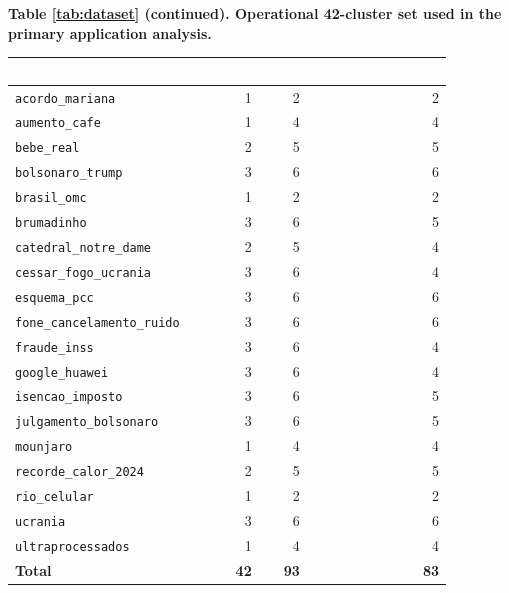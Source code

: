 \documentclass[sn-basic,Numbered]{sn-jnl}
\newcommand{\hd}[1]{\textcolor{white}{\textbf{#1}}}
\begin{document}
\FloatBarrier
\begin{center}
\textbf{Table \ref{tab:dataset} (continued). Operational 42-cluster set used in the primary
application analysis.}\par\smallskip
\scriptsize
\setlength{\tabcolsep}{5pt}
\begin{tabular}{@{}lrrr@{}}
\toprule
\rowcolor{headerblue}
\hd{Topic} & \hd{Clusters} & \hd{Slots} & \hd{Distinct segments} \\
\midrule
\texttt{acordo\_mariana} & 1 & 2 & 2 \\
\rowcolor{rowlight}\texttt{aumento\_cafe} & 1 & 4 & 4 \\
\texttt{bebe\_real} & 2 & 5 & 5 \\
\rowcolor{rowlight}\texttt{bolsonaro\_trump} & 3 & 6 & 6 \\
\texttt{brasil\_omc} & 1 & 2 & 2 \\
\rowcolor{rowlight}\texttt{brumadinho} & 3 & 6 & 5 \\
\texttt{catedral\_notre\_dame} & 2 & 5 & 4 \\
\rowcolor{rowlight}\texttt{cessar\_fogo\_ucrania} & 3 & 6 & 4 \\
\texttt{esquema\_pcc} & 3 & 6 & 6 \\
\rowcolor{rowlight}\texttt{fone\_cancelamento\_ruido} & 3 & 6 & 6 \\
\texttt{fraude\_inss} & 3 & 6 & 4 \\
\rowcolor{rowlight}\texttt{google\_huawei} & 3 & 6 & 4 \\
\texttt{isencao\_imposto} & 3 & 6 & 5 \\
\rowcolor{rowlight}\texttt{julgamento\_bolsonaro} & 3 & 6 & 5 \\
\texttt{mounjaro} & 1 & 4 & 4 \\
\rowcolor{rowlight}\texttt{recorde\_calor\_2024} & 2 & 5 & 5 \\
\texttt{rio\_celular} & 1 & 2 & 2 \\
\rowcolor{rowlight}\texttt{ucrania} & 3 & 6 & 6 \\
\texttt{ultraprocessados} & 1 & 4 & 4 \\
\midrule
\textbf{Total} & \textbf{42} & \textbf{93} & \textbf{83} \\
\bottomrule
\end{tabular}
\end{center}
\end{document}
